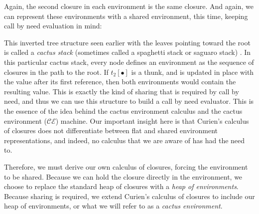 \begin{center}
\end{center}

Again, the second closure in each environment is the same closure.  And again,
we can represent these environments with a shared environment, this time,
keeping call by need evaluation in mind:
\begin{center}
\end{center}
This inverted tree structure seen earlier with the leaves pointing toward the
root is called a \emph{cactus stack} (sometimes called a spaghetti stack or
saguaro stack) \cite{hauck1968burroughs,ichbiah1979rationale}. In this
particular cactus stack, every node defines an environment as the sequence of
closures in the path to the root.  If $t_2[\bullet]$ is a thunk, and is updated
in place with the value after its first reference, then both environments would
contain the resulting value. This is exactly the kind of sharing that is
required by call by need, and thus we can use this structure to build a call by
need evaluator. This is the essence of the idea behind the cactus environment
calculus and the cactus environment ($\mathcal{CE}$) machine. Our important
insight here is that Curien's calculus of closures does not differentiate
between flat and shared environment representations, and indeed, no calculus
that we are aware of has had the need to.

Therefore, we must derive our own calculus of closures, forcing the environment
to be shared. Because we can hold the closure directly in the environment, we
choose to replace the standard heap of closures with a \emph{heap of
environments}. Because sharing is required, we extend Curien's calculus of
closures to include our heap of environments, or what we will refer to as a
\emph{cactus environment}. 

